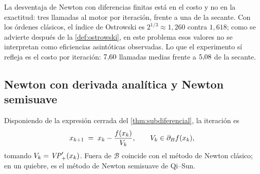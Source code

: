 La desventaja de Newton con diferencias finitas está en el costo y no en la exactitud: tres
llamadas al motor por iteración, frente a una de la secante. Con los órdenes
clásicos, el índice de Ostrowski es $2^{1/3}\approx1{,}260$ contra $1{,}618$; como
se advierte después de la \cref{def:ostrowski}, en este problema esos valores no
se interpretan como eficiencias asintóticas observadas. Lo que el experimento sí
refleja es el costo por iteración: $7{,}60$ llamadas medias frente a
$5{,}08$ de la secante.

\subsection{Newton con derivada analítica y Newton semisuave}

Disponiendo de la expresión cerrada del \cref{thm:subdiferencial}, la iteración es
\begin{equation}
\label{eq:newton-semisuave}
  x_{k+1} \;=\; x_k - \frac{f(x_k)}{V_k},
  \qquad V_k\in\partial_B f(x_k),
\end{equation}
tomando $V_k=\mathit{VP}'_+(x_k)$. Fuera de $\mathcal{B}$ coincide con el método de Newton
clásico; en un quiebre, es el método de Newton semisuave de Qi--Sun.

